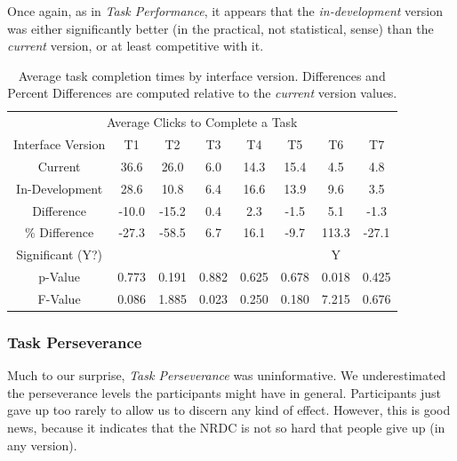 \documentclass{article}
\begin{document}
Once again, as in \emph{Task Performance}, it appears that the \emph{in-development} version was either significantly better (in the practical, not statistical, sense) than the \emph{current} version, or at least competitive with it.

\begin{table}[h]
    \centering
    \begin{tabular}{| c | c | c | c | c | c | c | c |}
    \hline
    \multicolumn{8}{|c|}{Average Clicks to Complete a Task} \\
    Interface Version & T1 & T2 & T3 & T4 & T5 & T6 & T7 \\
    \hline
    \hline
    Current           & 36.6 & 26.0 &  6.0 & 14.3 & 15.4 &  4.5 &  4.8 \\
    \hline
    In-Development    & 28.6 & 10.8 &  6.4 & 16.6 & 13.9 &  9.6 &  3.5 \\
    \hline
    \hline
    Difference        & -10.0 & -15.2 & 0.4 & 2.3 & -1.5 &  5.1 &  -1.3 \\
    \hline
    \% Difference     & -27.3 & -58.5 & 6.7 & 16.1 & -9.7 & 113.3 & -27.1 \\
    \hline
    \hline
    Significant (Y?) &       &       &       &       &       &     Y &       \\
    \hline
    p-Value          & 0.773 & 0.191 & 0.882 & 0.625 & 0.678 & 0.018 & 0.425 \\
    \hline
    F-Value          & 0.086 & 1.885 & 0.023 & 0.250 & 0.180 & 7.215 & 0.676 \\
    \hline
    \end{tabular}
    
    \caption{Average task completion times by interface version. Differences and Percent Differences are computed relative to the \emph{current} version values.}
    \label{tab:avg_clicks}
\end{table}

%
\subsubsection{Task Perseverance}
Much to our surprise, \emph{Task Perseverance} was uninformative. We underestimated the perseverance levels the participants might have in general. Participants just gave up too rarely to allow us to discern any kind of effect. However, this is good news, because it indicates that the NRDC is not so hard that people give up (in any version).
\end{document}
